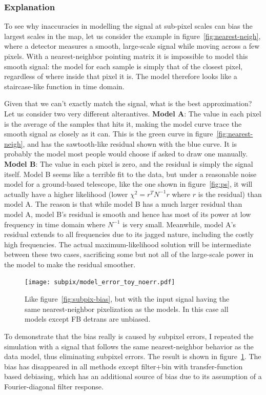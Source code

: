 \documentclass[twocolumn,apj]{aastex63}
\newcommand{\dfn}[1]{\textbf{#1}}
\begin{document}
\subsubsection{Explanation}
To see why inaccuracies in modelling the signal at sub-pixel scales can bias
the largest scales in the map, let us consider the example in figure~\ref{fig:nearest-neigh},
where a detector measures a smooth, large-scale signal while moving across a few
pixels. With a nearest-neighbor pointing matrix it is impossible to model this
smooth signal: the model for each sample is simply that of the closest pixel,
regardless of where inside that pixel it is. The model therefore looks like
a staircase-like function in time domain.

Given that we can't exactly match the signal, what is the best approximation?
Let us consider two very different alterantives. \dfn{Model A}: The value in each pixel
is the average of the samples that hits it, making the model curve trace the
smooth signal as closely as it can. This is the green curve in figure~\ref{fig:nearest-neigh},
and has the sawtooth-like residual shown with the blue curve. It is probably the
model most people would choose if asked to draw one manually.
\dfn{Model B}: The value in each pixel is zero, and the residual is simply the signal itself.
Model B seems like a terrible fit to the data, but under a reasonable noise model
for a ground-based telescope, like the one shown in figure~\ref{fig:ps}, it
will actually have a higher likelihood (lower $\chi^2 = r^TN^{-1}r$
where $r$ is the residual) than model A. The reason is that while model B has a much
larger residual than model A, model B's residual is smooth and hence has most of its
power at low frequency in time domain where $N^{-1}$ is very small. Meanwhile, model A's
residual extends to all frequencies due to its jagged nature, including the costly high
frequencies. The actual maximum-likelihood solution will be intermediate between these
two cases, sacrificing some but not all of the large-scale power in the model to make
the residual smoother.

\begin{figure}
	\centering
	\texttt{[image: subpix/model\_error\_toy\_noerr.pdf]}
	\caption{
		Like figure~\ref{fig:subpix-bias}, but with the input signal
		having the same nearest-neighbor pixelization as the models.
		In this case all models except FB detrans are unbiased.
	}
	\label{fig:subpix-noerr}
\end{figure}

To demonstrate that the bias really is caused by subpixel errors,
I repeated the simulation with a signal that follows the same nearest-neighbor
behavior as the data model, thus eliminating subpixel errors. The
result is shown in figure~\ref{fig:subpix-noerr}. The bias has disappeared
in all methods except filter+bin with transfer-function based debiasing,
which has an additional source of bias due to its assumption of a Fourier-diagonal
filter response.
\end{document}
